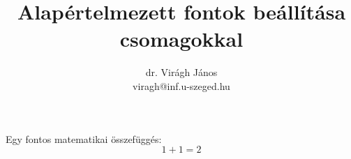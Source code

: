 \documentclass[12pt]{article}
\author{dr. Virágh János \\ viragh@inf.u-szeged.hu}
\title{Alapértelmezett fontok beállítása csomagokkal}
\begin{document}
 \maketitle

\hulipsum[2]
\vspace*{1em}

Egy fontos matematikai összefüggés:
\[1 + 1 = 2\]
\end{document}
